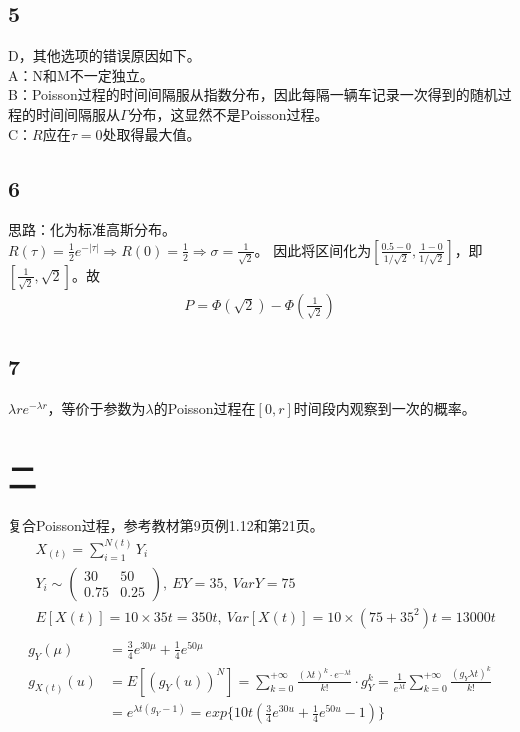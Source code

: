 \documentclass{article}
\begin{document}
    \subsection*{5}
    D，其他选项的错误原因如下。 \\
    A：N和M不一定独立。\\
    B：Poisson过程的时间间隔服从指数分布，因此每隔一辆车记录一次得到的随机过程的时间间隔服从$\Gamma$分布，这显然不是Poisson过程。\\
    C：$R$应在$\tau=0$处取得最大值。
    \subsection*{6}
    思路：化为标准高斯分布。\\
    $R(\tau)=\frac{1}{2}e^{-|\tau|}\Rightarrow R(0)=\frac{1}{2}\Rightarrow \sigma=\frac{1}{\sqrt{2}}$。
    因此将区间化为$[\frac{0.5-0}{1/\sqrt{2}},\frac{1-0}{1/\sqrt{2}}]$，即$[\frac{1}{\sqrt{2}},\sqrt{2}]$。故
    \begin{align*}
        P=\Phi(\sqrt{2})-\Phi(\frac{1}{\sqrt{2}})
    \end{align*}
    \subsection*{7}
    $\lambda re^{-\lambda r}$，等价于参数为$\lambda$的Poisson过程在$[0,r]$时间段内观察到一次的概率。
    \section*{二}

复合Poisson过程，参考教材第9页例1.12和第21页。\\
\begin{align*}
    &X_{(t)}=\sum_{i=1}^{N(t)}Y_{i}\\
    &Y_{i}\sim\begin{pmatrix}30&50\\0.75&0.25\end{pmatrix},\ EY=35,\ VarY=75\\
    &E[X(t)]=10\times35t=350t,\ Var[X(t)]=10\times(75+35^{2})t=13000t\\
\end{align*}
\begin{align*}    
    g_{Y}(\mu)&=\frac{3}{4}e^{30\mu}+\frac{1}{4}e^{50\mu}\\
    g_{X(t)}(u)&=E[(g_{Y}(u))^{N}]=\sum_{k=0}^{+\infty}\frac{(\lambda t)^{k}\cdot e^{-\lambda t}}{k!}\cdot g_{Y}^{k}=\frac{1}{e^{\lambda t}}\sum_{k=0}^{+\infty}\frac{(g_{Y}\lambda t)^{k}}{k!}\\
    &=e^{\lambda t(g_{Y}-1)}=exp\{10t(\frac{3}{4}e^{30u}+\frac{1}{4}e^{50u}-1)\}
\end{align*}
\end{document}
